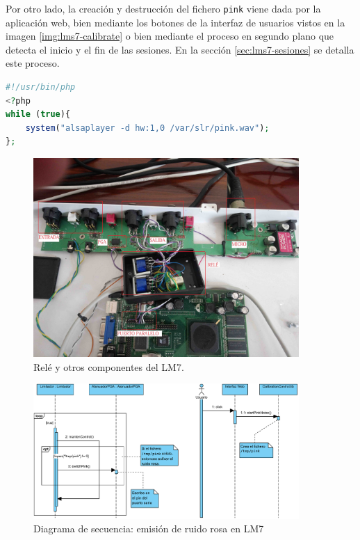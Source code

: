 Por otro lado, la creación y destrucción del fichero \verb|pink| viene dada por la aplicación web, bien mediante los botones de la interfaz de usuarios vistos en la imagen \ref{img:lms7-calibrate} o bien mediante el proceso en segundo plano que detecta el inicio y el fin de las sesiones. En la sección \ref{sec:lms7-sesiones} se detalla este proceso. \\

\begin{lstlisting}[language=php, label={lst:pink}, caption=Script de emisión continuo de ruido rosa.]
#!/usr/bin/php
<?php
while (true){
	system("alsaplayer -d hw:1,0 /var/slr/pink.wav");
};
\end{lstlisting}

\begin{figure}[h]
    \centering
    \includegraphics[width=0.9\textwidth]{imagenes/lm7-fotos/lms7-rele.jpg}
    \caption{Relé y otros componentes del LM7.}
    \label{img:lm7-rele}
\end{figure}

\begin{figure}[h]
    \centering
    \includegraphics[width=0.9\textwidth]{figuras/lms7-pink-noise-generation.pdf}
    \caption{Diagrama de secuencia: emisión de ruido rosa en LM7}
    \label{fig:lm7-pink-noise}
\end{figure}

